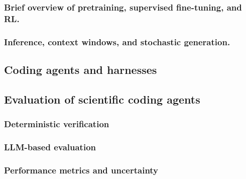 \lipsum[1][1-3]

\subsubsection{Brief overview of pretraining, supervised fine-tuning, and RL.}

\lipsum[1][1-3]

\subsubsection{ Inference, context windows, and stochastic generation.}

\lipsum[1][1-3]

\subsection{Coding agents and harnesses}

\lipsum[1][1-3]

\subsection{Evaluation of scientific coding agents}

\lipsum[1][1-3]

\subsubsection{Deterministic verification}

\lipsum[1][1-3]

\subsubsection{LLM-based evaluation}

\lipsum[1][1-3]

\subsubsection{Performance metrics and uncertainty}

\lipsum[1][1-3]
